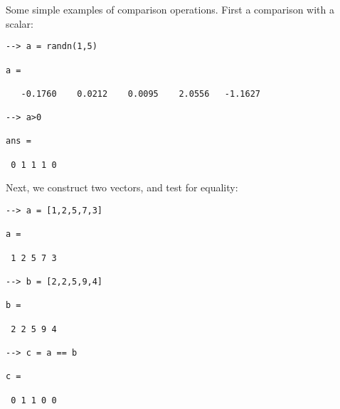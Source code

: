 Some simple examples of comparison operations.  First a comparison with a scalar:
\begin{verbatim}
--> a = randn(1,5)

a = 

   -0.1760    0.0212    0.0095    2.0556   -1.1627 

--> a>0

ans = 

 0 1 1 1 0 
\end{verbatim}
Next, we construct two vectors, and test for equality:
\begin{verbatim}
--> a = [1,2,5,7,3]

a = 

 1 2 5 7 3 

--> b = [2,2,5,9,4]

b = 

 2 2 5 9 4 

--> c = a == b

c = 

 0 1 1 0 0 
\end{verbatim}
